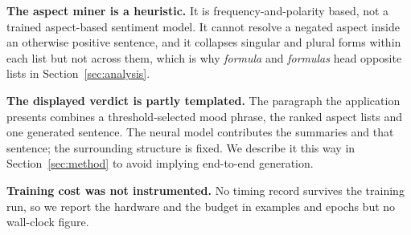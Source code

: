 \textbf{The aspect miner is a heuristic.} It is frequency-and-polarity based,
not a trained aspect-based sentiment model. It cannot resolve a negated aspect
inside an otherwise positive sentence, and it collapses singular and plural
forms within each list but not across them, which is why \emph{formula} and
\emph{formulas} head opposite lists in Section~\ref{sec:analysis}.

\textbf{The displayed verdict is partly templated.} The paragraph the
application presents combines a threshold-selected mood phrase, the ranked
aspect lists and one generated sentence. The neural model contributes the
summaries and that sentence; the surrounding structure is fixed. We describe it
this way in Section~\ref{sec:method} to avoid implying end-to-end generation.

\textbf{Training cost was not instrumented.} No timing record survives the
training run, so we report the hardware and the budget in examples and epochs
but no wall-clock figure.
